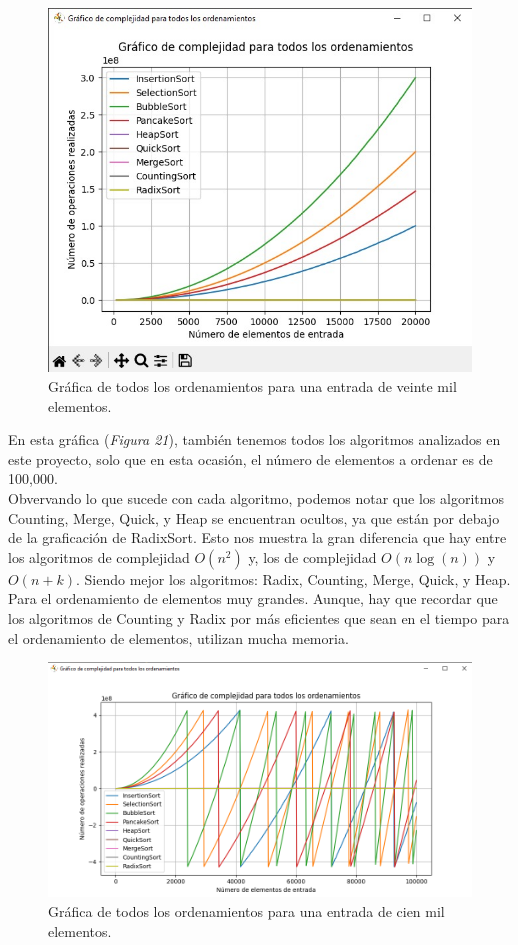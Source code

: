 \documentclass[a4paper,12pt]{article}
\begin{document}
\begin{figure}[h]
    \centering
    \includegraphics[width=1\textwidth]{media/graficaD_20k.jpg}
    \caption{Gráfica de todos los ordenamientos para una entrada de veinte mil elementos.}
    \label{fig:grafD_20k}
\end{figure}

En esta gráfica (\textit{Figura 21}), también tenemos todos los algoritmos analizados en este proyecto, solo que en esta ocasión, el número de elementos a ordenar es de 100,000.\\

Obvervando lo que sucede con cada algoritmo, podemos notar que los algoritmos Counting, Merge, Quick, y Heap se encuentran ocultos, ya que están por debajo de la graficación de RadixSort. Esto nos muestra la gran diferencia que hay entre los algoritmos de complejidad $O(n^2)$ y, los de complejidad $O(n\log(n))$ y $O(n+k)$. Siendo mejor los algoritmos: Radix, Counting, Merge, Quick, y Heap. Para el ordenamiento de elementos muy grandes. Aunque, hay que recordar que los algoritmos de Counting y Radix por más eficientes que sean en el tiempo para el ordenamiento de elementos, utilizan mucha memoria. 

\begin{figure}[h]
    \centering
    \includegraphics[width=1\textwidth]{media/graficaD_100k.png}
    \caption{Gráfica de todos los ordenamientos para una entrada de cien mil elementos.}
    \label{fig:grafD_100k}
\end{figure}
\end{document}
